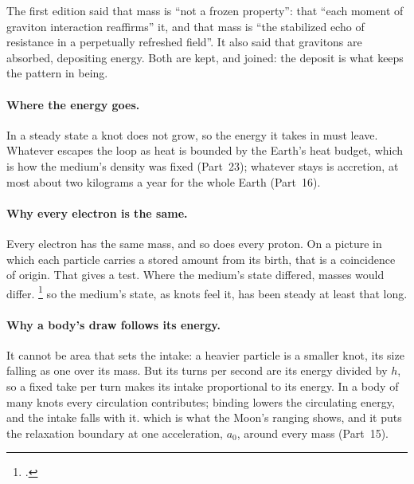 \documentclass[11pt,a4paper]{article}
\newcommand{\fn}[1]{\footnote{\citealp{#1}.}}
\begin{document}
The first edition said that mass is ``not a frozen property'': that ``each moment of graviton interaction reaffirms'' it, and that mass is ``the stabilized echo of resistance in a perpetually refreshed field''. It also said that gravitons are absorbed, depositing energy. Both are kept, and joined: the deposit is what keeps the pattern in being.

\paragraph{Where the energy goes.} In a steady state a knot does not grow, so the energy it takes in must leave.  Whatever escapes the loop as heat is bounded by the Earth's heat budget, which is how the medium's density was fixed (Part~23); whatever stays is accretion, at most about two kilograms a year for the whole Earth (Part~16).

\paragraph{Why every electron is the same.} Every electron has the same mass, and so does every proton. On a picture in which each particle carries a stored amount from its birth, that is a coincidence of origin.  That gives a test. Where the medium's state differed, masses would differ. \fn{bagdonaite2013} so the medium's state, as knots feel it, has been steady at least that long.

\paragraph{Why a body's draw follows its energy.}  It cannot be area that sets the intake: a heavier particle is a smaller knot, its size falling as one over its mass. But its turns per second are its energy divided by $h$, so a fixed take per turn makes its intake proportional to its energy. In a body of many knots every circulation contributes; binding lowers the circulating energy, and the intake falls with it.  which is what the Moon's ranging shows, and it puts the relaxation boundary at one acceleration, $a_0$, around every mass (Part~15). 
\end{document}
